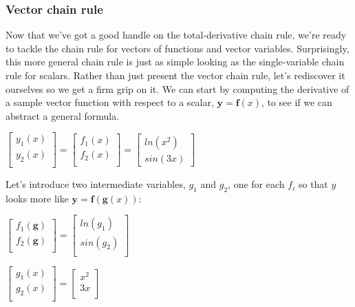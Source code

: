 \documentclass[11pt]{article}
\begin{document}
\subsubsection{Vector chain rule}

Now that we've got a good handle on the total-derivative chain rule, we're ready to tackle the chain rule for vectors of functions and vector variables. Surprisingly, this more general chain rule is just as simple looking as the single-variable chain rule for scalars. Rather than just present the vector chain rule, let's rediscover it ourselves so we get a firm grip on it. We can start by computing the derivative of a sample vector function with respect to a scalar, $\mathbf{y} = \mathbf{f}(x)$, to see if we can abstract a general formula.   

$
\begin{bmatrix}
	y_1(x)\\
	y_2(x)\\
\end{bmatrix} =
\begin{bmatrix}
	f_1(x)\\
	f_2(x)\\
\end{bmatrix} = 
\begin{bmatrix}
	ln(x^2)\\
	sin(3x)
\end{bmatrix}
$

Let's introduce two intermediate variables, $g_1$ and $g_2$, one for each $f_i$ so that $y$ looks more like $\mathbf{y} = \mathbf{f}(\mathbf{g}(x))$:

$
\begin{bmatrix}
	f_1(\mathbf{g})\\
	f_2(\mathbf{g})\\
\end{bmatrix} = \begin{bmatrix}
	ln(g_1)\\
	sin(g_2)\\
\end{bmatrix}
$

$
\begin{bmatrix}
	g_1(x)\\
	g_2(x)\\
\end{bmatrix} = \begin{bmatrix}
	x^2\\
	3x\\
\end{bmatrix}
$
\end{document}
